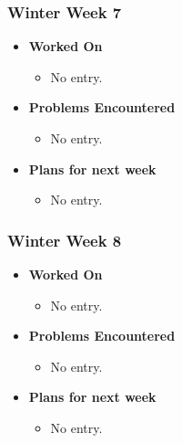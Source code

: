 \documentclass[compsoc,draftclsnofoot,onecolumn,10pt]{IEEEtran}
\begin{document}
\subsubsection{Winter Week 7}
\begin{itemize}
    \item {\textbf{Worked On}}
    \begin{itemize}
      \item No entry.
    \end{itemize}

    \item {\textbf{Problems Encountered}}
    \begin{itemize}
      \item No entry.
    \end{itemize}

    \item{\textbf{Plans for next week}}
    \begin{itemize}
      \item No entry.
    \end{itemize}

\end{itemize}

\subsubsection{Winter Week 8}
\begin{itemize}
    \item {\textbf{Worked On}}
    \begin{itemize}
      \item No entry.
    \end{itemize}

    \item {\textbf{Problems Encountered}}
    \begin{itemize}
      \item No entry.
    \end{itemize}

    \item{\textbf{Plans for next week}}
    \begin{itemize}
      \item No entry.
    \end{itemize}

\end{itemize}
\end{document}
